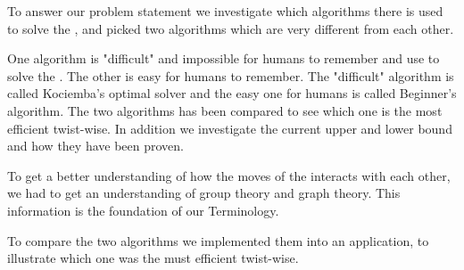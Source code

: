 To answer our problem statement we investigate which algorithms there is used to solve the \rubik{}, and picked two algorithms which are very different from each other. 

One algorithm is "difficult" and impossible for humans to remember and use to solve the \rubik{}. 
The other is easy for humans to remember. 
The "difficult" algorithm is called Kociemba's optimal solver and the easy one for humans is called Beginner's algorithm. 
The two algorithms has been compared to see which one is the most efficient twist-wise. 
In addition we investigate the current upper and lower bound and how they have been proven.

To get a better understanding of how the moves of the \rubik{} interacts with each other, we had to get an understanding of group theory and graph theory. This information is the foundation of our Terminology.

To compare the two algorithms we implemented them into an application, to illustrate which one was the must efficient twist-wise. 


